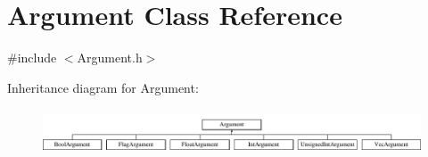 \hypertarget{classArgument}{\section{Argument Class Reference}
\label{classArgument}
}


{\ttfamily \#include $<$Argument.\-h$>$}

Inheritance diagram for Argument\-:\begin{figure}[H]
\begin{center}
\leavevmode
\includegraphics[height=1.342926cm]{classArgument}
\end{center}
\end{figure}
